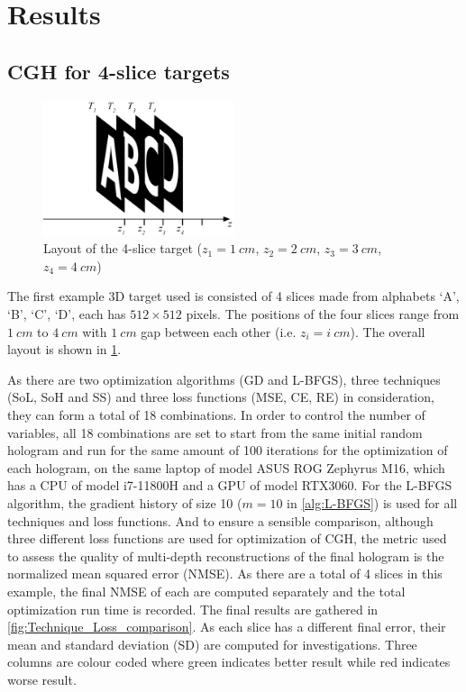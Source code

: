 \section{Results}
\subsection{CGH for 4-slice targets}

\begin{figure}[h!]
	\centering
	\includegraphics[width=0.5\textwidth]{Fresnel_slice_ABCD}
	\caption{Layout of the 4-slice target ($z_1=1\ cm$, $z_2=2\ cm$, $z_3=3\ cm$, $z_4=4\ cm$)}
	\label{fig:Fresnel_slice_ABCD}
\end{figure}

The first example 3D target used is consisted of 4 slices made from alphabets `A', `B', `C', `D', each has $512\times512$ pixels. The positions of the four slices range from $1\ cm$ to $4\ cm$ with $1\ cm$ gap between each other (i.e. $z_i=i\ cm$). The overall layout is shown in \cref{fig:Fresnel_slice_ABCD}.

As there are two optimization algorithms (GD and L-BFGS), three techniques (SoL, SoH and SS) and three loss functions (MSE, CE, RE) in consideration, they can form a total of 18 combinations. In order to control the number of variables, all 18 combinations are set to start from the same initial random hologram and run for the same amount of 100 iterations for the optimization of each hologram, on the same laptop of model ASUS ROG Zephyrus M16, which has a CPU of model i7-11800H and a GPU of model RTX3060. For the L-BFGS algorithm, the gradient history of size 10 ($m=10$ in \cref{alg:L-BFGS}) is used for all techniques and loss functions. And to ensure a sensible comparison, although three different loss functions are used for optimization of CGH, the metric used to assess the quality of multi-depth reconstructions of the final hologram is the normalized mean squared error (NMSE). As there are a total of 4 slices in this example, the final NMSE of each are computed separately and the total optimization run time is recorded. The final results are gathered in \cref{fig:Technique_Loss_comparison}. As each slice has a different final error, their mean and standard deviation (SD) are computed for investigations. Three columns are colour coded where green indicates better result while red indicates worse result.

